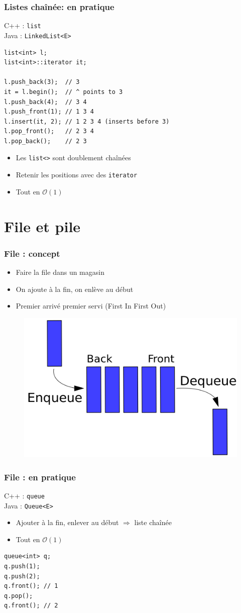 \documentclass[12pt]{beamer}
\newcommand{\bigoh}[1]{\mathcal{O}\left(#1\right)}
\newcommand{\constant}{\bigoh{1}}
\begin{document}
\begin{frame}[fragile]
\frametitle{Listes chaînée: en pratique}
C++ : \texttt{list} \\
Java : \texttt{LinkedList<E>}
\begin{lstlisting}
list<int> l;
list<int>::iterator it;

l.push_back(3);  // 3
it = l.begin();  // ^ points to 3
l.push_back(4);  // 3 4
l.push_front(1); // 1 3 4
l.insert(it, 2); // 1 2 3 4 (inserts before 3)
l.pop_front();   // 2 3 4
l.pop_back();    // 2 3
\end{lstlisting}
\begin{itemize}
\item Les \texttt{list<>} sont doublement chaînées
\item Retenir les positions avec des \texttt{iterator}
\item Tout en $\constant$
\end{itemize}
\end{frame}

\section{File et pile}

\begin{frame}
\frametitle{File : concept}
\begin{itemize}
\item Faire la file dans un magasin
\item On ajoute à la fin, on enlève au début
\item Premier arrivé premier servi (First In First Out)
\end{itemize}
\begin{figure}
\centering
\includegraphics[width=.6\textwidth]{img/queue}
\end{figure}
\end{frame}

\begin{frame}[fragile]
\frametitle{File : en pratique}
C++ : \texttt{queue} \\
Java : \texttt{Queue<E>}
\begin{itemize}
\item Ajouter à la fin, enlever au début $\Rightarrow$ liste chaînée
\item Tout en $\constant$
\end{itemize}
\begin{lstlisting}
queue<int> q;
q.push(1);
q.push(2);
q.front(); // 1
q.pop();
q.front(); // 2
\end{lstlisting}
\end{frame}
\end{document}
